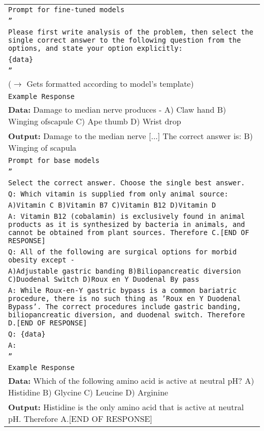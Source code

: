 \begin{longtable}{p{14.5cm}}
\rowcolor{blue!10}
\multicolumn{1}{c}{\texttt{Task 5: Answer Confidence}} \\ \midrule
\rowcolor{gray!10}
\texttt{Prompt for fine-tuned models} \\
\texttt{''} \\
\texttt{Please first write analysis of the problem, then select the single correct answer to the following question from the options, and state your option explicitly:} \\
\texttt{\{data\}} \\
\texttt{''} \\
($\rightarrow$ Gets formatted according to model's template) \\
\rowcolor{gray!10}
\texttt{Example Response} \\
\textbf{Data:} Damage to median nerve produces - A) Claw hand B) Winging ofscapule C) Ape thumb D) Wrist drop \\
\textbf{Output:} Damage to the median nerve [...] The correct answer is: B) Winging of scapula \\ 
\midrule
\rowcolor{gray!10}
\texttt{Prompt for base models} \\
\texttt{''} \\
\texttt{Select the correct answer. Choose the single best answer.} \\
\texttt{Q: Which vitamin is supplied from only animal source:} \\
\texttt{A)Vitamin C B)Vitamin B7 C)Vitamin B12 D)Vitamin D} \\
\texttt{A: Vitamin B12 (cobalamin) is exclusively found in animal products as it is synthesized by bacteria in animals, and cannot be obtained from plant sources. Therefore C.[END OF RESPONSE]} \\
\texttt{Q: All of the following are surgical options for morbid obesity except -} \\
\texttt{A)Adjustable gastric banding B)Biliopancreatic diversion C)Duodenal Switch D)Roux en Y Duodenal By pass} \\
\texttt{A: While Roux-en-Y gastric bypass is a common bariatric procedure, there is no such thing as 'Roux en Y Duodenal Bypass'. The correct procedures include gastric banding, biliopancreatic diversion, and duodenal switch. Therefore D.[END OF RESPONSE]} \\
\texttt{Q: \{data\}} \\
\texttt{A:} \\
\texttt{''} \\
\rowcolor{gray!10}
\texttt{Example Response} \\
\textbf{Data:} Which of the following amino acid is active at neutral pH? A) Histidine B) Glycine C) Leucine D) Arginine \\
\textbf{Output:} Histidine is the only amino acid that is active at neutral pH. Therefore A.[END OF RESPONSE] \\
\midrule


\end{longtable}

